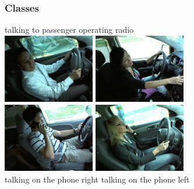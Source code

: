 \documentclass{beamer}
\begin{document}
	\begin{frame}
		\frametitle{Classes}
		\begin{center}
            talking to passenger \quad \quad \quad operating radio \quad \\
			\includegraphics[width=4cm]{img_19} \vspace{0.1cm}
			\includegraphics[width=4cm]{img_56} \\
			\includegraphics[width=4cm]{img_94}\vspace{0.1cm}
			\includegraphics[width=4cm]{img_14}\\
            talking on the phone right \quad  talking on the phone left \quad \\
		\end{center}
	\end{frame}
	
\end{document}
